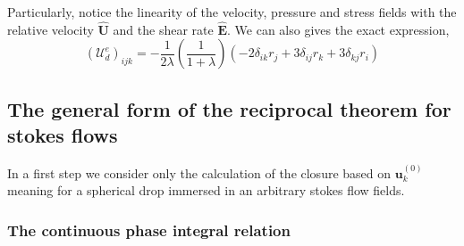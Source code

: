 Particularly, notice the linearity of the velocity, pressure and stress fields with the relative velocity $\hat{\textbf{U}}$ and the shear rate $\hat{\textbf{E}}$. 
We can also gives the exact expression, 
\begin{equation*}
    (\mathcal{U}_d^e)_{ijk} 
    = 
    - \frac{1}{2\lambda}\left(\frac{1}{1+\lambda}\right)(-2 \delta_{ik} r_j + 3\delta_{ij} r_k + 3\delta_{kj} r_i) 
\end{equation*}

\subsection{The general form of the reciprocal theorem for stokes flows}

In a first step we consider only the calculation of the closure based on $\textbf{u}^{(0)}_k$ meaning for a spherical drop immersed in an arbitrary stokes flow fields. 

\subsubsection{The continuous phase integral relation}

